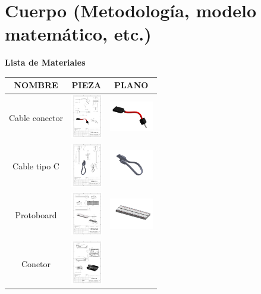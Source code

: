     \section{Cuerpo (Metodología, modelo matemático, etc.)}
    \item \textbf{Lista de Materiales} 
    \begin{table} [H]
          
      \huge
      \tiny 
      \begin{tabular}   {| c |  c |  c | }
      
      \hline
      NOMBRE & PIEZA  & PLANO \\
      \hline 
      Cable conector &  \includegraphics[height=19mm]{1/img/cable conetor.pdf}  & 
       \includegraphics[width=19mm]{1/img/cable conetor_1.pdf} \\
        \hline
        Cable tipo C &  \includegraphics[height=19mm]{1/img/Cable tipo C.pdf}  & 
       \includegraphics[width=19mm]{1/img/Cable tipo C_1.pdf} \\
        \hline
      Protoboard &  \includegraphics[height=19mm]{1/img/Protoboard.pdf}  & 
       \includegraphics[width=19mm]{1/img/Protoboard_1.pdf} \\
        \hline
       Conetor &  \includegraphics[height=19mm]{1/img/Conector.pdf}  & 

\end{tabular}
\end{table}
